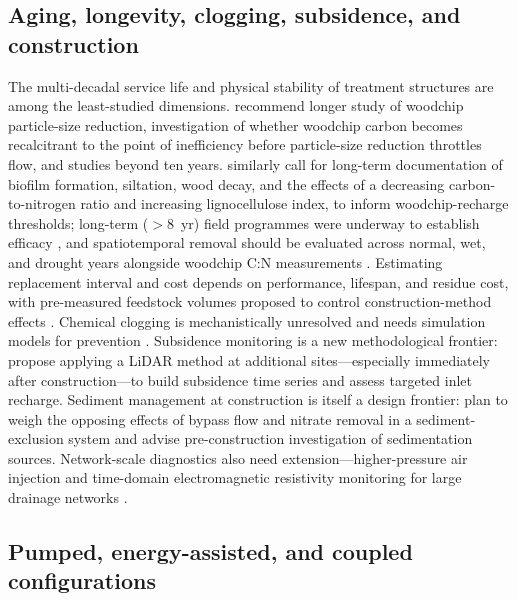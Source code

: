 \documentclass[11pt]{article}
\begin{document}
\subsection{Aging, longevity, clogging, subsidence, and construction}

The multi-decadal service life and physical stability of treatment structures are
among the least-studied dimensions. \textcite{Ghane2018} recommend longer study
of woodchip particle-size reduction, investigation of whether woodchip carbon
becomes recalcitrant to the point of inefficiency before particle-size reduction
throttles flow, and studies beyond ten years. \textcite{Christianson2020}
similarly call for long-term documentation of biofilm formation, siltation, wood
decay, and the effects of a decreasing carbon-to-nitrogen ratio and increasing
lignocellulose index, to inform woodchip-recharge thresholds; long-term
($>$8~yr) field programmes were underway to establish efficacy
\parencite{Greenan2009}, and spatiotemporal removal should be evaluated across
normal, wet, and drought years alongside woodchip C:N measurements
\parencite{Hartfiel2023b}. Estimating replacement interval and cost depends on
performance, lifespan, and residue cost, with pre-measured feedstock volumes
proposed to control construction-method effects \parencite{Kohn2023}. Chemical
clogging is mechanistically unresolved and needs simulation models for prevention
\parencite{Guo2020,Guo2021}. Subsidence monitoring is a new methodological
frontier: \textcite{Christianson2025b} propose applying a LiDAR method at
additional sites---especially immediately after construction---to build
subsidence time series and assess targeted inlet recharge. Sediment management at
construction is itself a design frontier: \textcite{Feyereisen2023} plan to weigh
the opposing effects of bypass flow and nitrate removal in a sediment-exclusion
system and advise pre-construction investigation of sedimentation sources.
Network-scale diagnostics also need extension---higher-pressure air injection and
time-domain electromagnetic resistivity monitoring for large drainage networks
\parencite{Henine2021}.

\subsection{Pumped, energy-assisted, and coupled configurations}
\end{document}
